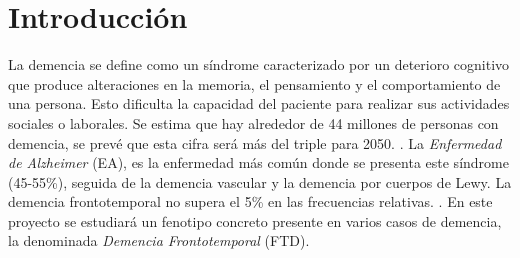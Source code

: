 \section{Introducción}

La demencia se define como un síndrome caracterizado por un deterioro cognitivo que produce alteraciones en la memoria, el pensamiento y el comportamiento de una persona. Esto dificulta la capacidad del paciente para realizar sus actividades sociales o laborales. \cite{Formiga2009} Se estima que hay alrededor de 44 millones de personas con demencia, se prevé que esta cifra será más del triple para 2050. \cite{Long2023}.
La \textit{Enfermedad de Alzheimer} (EA), es la enfermedad más común donde se presenta este síndrome (45-55\%), seguida de la demencia vascular y la demencia por cuerpos de Lewy. La demencia frontotemporal no supera el 5\% en las frecuencias relativas. \cite{ GOODMAN201728, GarreOlmo2016}. En este proyecto se estudiará un fenotipo concreto presente en varios casos de demencia, la denominada \textit{Demencia Frontotemporal} (FTD).

